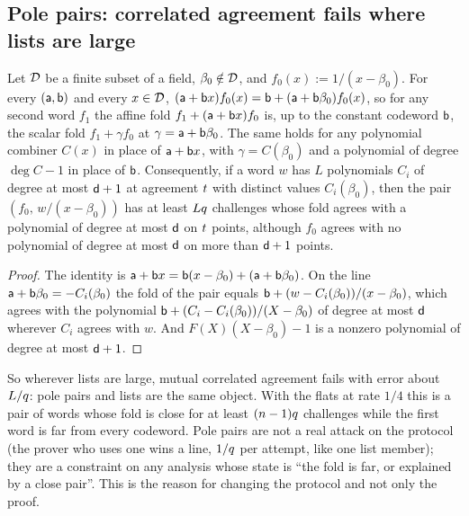 \subsection{Pole pairs: correlated agreement fails where lists are large}\label{sec:pole}

\begin{proposition}\label{prop:pole}
Let $\mathcal{D}$ be a finite subset of a field, $\beta_0\notin\mathcal{D}$, and $f_0(x):=1/(x-\beta_0)$. For every $(\mathsf{a},\mathsf{b})$ and every $x\in\mathcal{D}$, $(\mathsf{a}+\mathsf{b} x)f_0(x)=\mathsf{b}+(\mathsf{a}+\mathsf{b}\beta_0)f_0(x)$, so for any second word $f_1$ the affine fold $f_1+(\mathsf{a}+\mathsf{b} x)f_0$ is, up to the constant codeword $\mathsf{b}$, the scalar fold $f_1+\gamma f_0$ at $\gamma=\mathsf{a}+\mathsf{b}\beta_0$. The same holds for any polynomial combiner $C(x)$ in place of $\mathsf{a}+\mathsf{b} x$, with $\gamma=C(\beta_0)$ and a polynomial of degree $\deg C-1$ in place of $\mathsf{b}$. Consequently, if a word $w$ has $L$ polynomials $C_i$ of degree at most $\mathsf{d}+1$ at agreement $t$ with distinct values $C_i(\beta_0)$, then the pair $(f_0,\,w/(x-\beta_0))$ has at least $Lq$ challenges whose fold agrees with a polynomial of degree at most $\mathsf{d}$ on $t$ points, although $f_0$ agrees with no polynomial of degree at most $\mathsf{d}$ on more than $\mathsf{d}+1$ points.
\end{proposition}
\begin{proof}
The identity is $\mathsf{a}+\mathsf{b} x=\mathsf{b}(x-\beta_0)+(\mathsf{a}+\mathsf{b}\beta_0)$. On the line $\mathsf{a}+\mathsf{b}\beta_0=-C_i(\beta_0)$ the fold of the pair equals $\mathsf{b}+(w-C_i(\beta_0))/(x-\beta_0)$, which agrees with the polynomial $\mathsf{b}+(C_i-C_i(\beta_0))/(X-\beta_0)$ of degree at most $\mathsf{d}$ wherever $C_i$ agrees with $w$. And $F(X)(X-\beta_0)-1$ is a nonzero polynomial of degree at most $\mathsf{d}+1$.
\end{proof}

So wherever lists are large, mutual correlated agreement fails with error about $L/q$: pole pairs and lists are the same object. With the flats at rate $1/4$ this is a pair of words whose fold is close for at least $(n-1)q$ challenges while the first word is far from every codeword. Pole pairs are not a real attack on the protocol (the prover who uses one wins a line, $1/q$ per attempt, like one list member); they are a constraint on any analysis whose state is ``the fold is far, or explained by a close pair''. This is the reason for changing the protocol and not only the proof.


